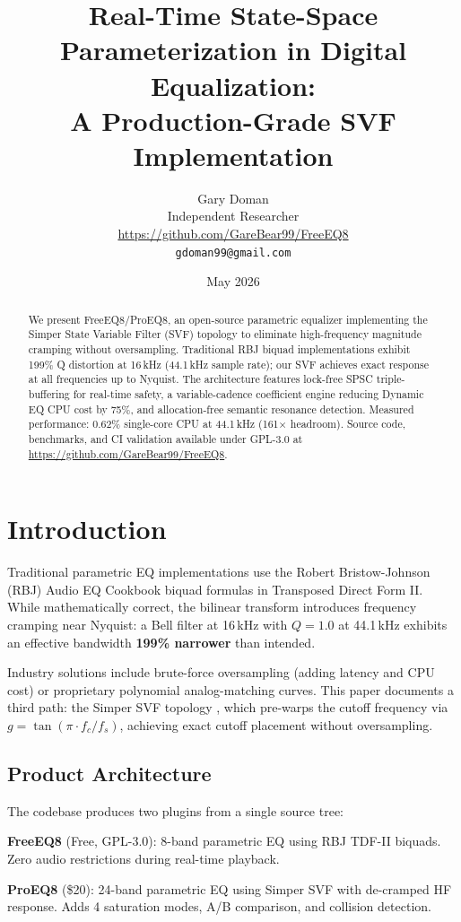 \documentclass[11pt,a4paper]{article}
\title{Real-Time State-Space Parameterization in Digital Equalization:\\A Production-Grade SVF Implementation}
\author{Gary Doman\\
Independent Researcher\\
\url{https://github.com/GareBear99/FreeEQ8}\\
\texttt{gdoman99@gmail.com}}
\date{May 2026}
\begin{document}
\maketitle

\begin{abstract}
We present FreeEQ8/ProEQ8, an open-source parametric equalizer implementing the Simper State Variable Filter (SVF) topology to eliminate high-frequency magnitude cramping without oversampling. Traditional RBJ biquad implementations exhibit 199\% Q distortion at 16\,kHz (44.1\,kHz sample rate); our SVF achieves exact response at all frequencies up to Nyquist. The architecture features lock-free SPSC triple-buffering for real-time safety, a variable-cadence coefficient engine reducing Dynamic EQ CPU cost by 75\%, and allocation-free semantic resonance detection. Measured performance: 0.62\% single-core CPU at 44.1\,kHz (161$\times$ headroom). Source code, benchmarks, and CI validation available under GPL-3.0 at \url{https://github.com/GareBear99/FreeEQ8}.
\end{abstract}

\section{Introduction}
Traditional parametric EQ implementations use the Robert Bristow-Johnson (RBJ) Audio EQ Cookbook biquad formulas \cite{rbj} in Transposed Direct Form II. While mathematically correct, the bilinear transform introduces frequency cramping near Nyquist: a Bell filter at 16\,kHz with $Q=1.0$ at 44.1\,kHz exhibits an effective bandwidth \textbf{199\% narrower} than intended.

Industry solutions include brute-force oversampling (adding latency and CPU cost) or proprietary polynomial analog-matching curves. This paper documents a third path: the Simper SVF topology \cite{simper}, which pre-warps the cutoff frequency via $g = \tan(\pi \cdot f_c / f_s)$, achieving exact cutoff placement without oversampling.

\subsection{Product Architecture}
The codebase produces two plugins from a single source tree:

\textbf{FreeEQ8} (Free, GPL-3.0): 8-band parametric EQ using RBJ TDF-II biquads. Zero audio restrictions during real-time playback.

\textbf{ProEQ8} (\$20): 24-band parametric EQ using Simper SVF with de-cramped HF response. Adds 4 saturation modes, A/B comparison, and collision detection.
\end{document}
